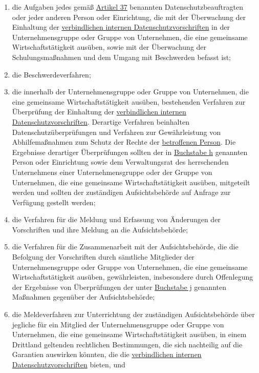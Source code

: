 \begin{enumerate}
\begin{enumerate}
    \item die Aufgaben jedes gemäß \hyperref[ch:37]{Artikel 37} benannten Datenschutzbeauftragten oder jeder anderen
     Person oder Einrichtung, die mit der Überwachung der Einhaltung der \hyperref[itm:04-20]{verbindlichen internen Datenschutzvorschriften}
     in der Unternehmensgruppe oder Gruppe von Unternehmen, die eine gemeinsame Wirtschaftstätigkeit ausüben, sowie mit
     der Überwachung der Schulungsmaßnahmen und dem Umgang mit Beschwerden befasst ist;
    \label{itm:47-2h}

    \item die Beschwerdeverfahren;
    \label{itm:47-2i}

    \item die innerhalb der Unternehmensgruppe oder Gruppe von Unternehmen, die eine gemeinsame Wirtschaftstätigkeit
     ausüben, bestehenden Verfahren zur Überprüfung der Einhaltung der \hyperref[itm:04-20]{verbindlichen internen Datenschutzvorschriften}.
     Derartige Verfahren beinhalten Datenschutzüberprüfungen und Verfahren zur Gewährleistung von Abhilfemaßnahmen zum
     Schutz der Rechte der \hyperref[itm:04-1]{betroffenen Person}. Die Ergebnisse derartiger Überprüfungen sollten der in \hyperref
     [itm:47-2h]{Buchstabe h} genannten Person oder Einrichtung sowie dem Verwaltungsrat des herrschenden Unternehmens
     einer Unternehmensgruppe oder der Gruppe von Unternehmen, die eine gemeinsame Wirtschaftstätigkeit ausüben,
     mitgeteilt werden und sollten der zuständigen Aufsichtsbehörde auf Anfrage zur Verfügung gestellt werden;
    \label{itm:47-2j}

    \item die Verfahren für die Meldung und Erfassung von Änderungen der Vorschriften und ihre Meldung an die
     Aufsichtsbehörde;
    \label{itm:47-2k}

    \item die Verfahren für die Zusammenarbeit mit der Aufsichtsbehörde, die die Befolgung der Vorschriften durch
     sämtliche Mitglieder der Unternehmensgruppe oder Gruppe von Unternehmen, die eine gemeinsame Wirtschaftstätigkeit
     ausüben, gewährleisten, insbesondere durch Offenlegung der Ergebnisse von Überprüfungen der unter \hyperref
     [itm:47-2j]{Buchstabe j} genannten Maßnahmen gegenüber der Aufsichtsbehörde;
    \label{itm:47-2l}

    \item die Meldeverfahren zur Unterrichtung der zuständigen Aufsichtsbehörde über jegliche für ein Mitglied der
     Unternehmensgruppe oder Gruppe von Unternehmen, die eine gemeinsame Wirtschaftstätigkeit ausüben, in einem
     Drittland geltenden rechtlichen Bestimmungen, die sich nachteilig auf die Garantien auswirken könnten, die die
     \hyperref[itm:04-20]{verbindlichen internen Datenschutzvorschriften} bieten, und
    \label{itm:47-2m}


\end{enumerate}
\end{enumerate}
